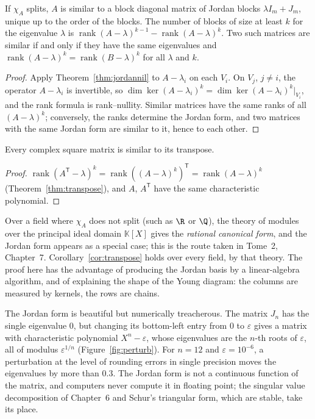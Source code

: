 \begin{corollary}\label{cor:jordan}
If $\chi_A$ splits, $A$ is similar to a block diagonal matrix of Jordan blocks $\lambda I_m+J_m$, unique up to the order of
the blocks. The number of blocks of size at least $k$ for the eigenvalue $\lambda$ is
$\operatorname{rank}(A-\lambda)^{k-1}-\operatorname{rank}(A-\lambda)^k$. Two such matrices are similar if and only if
they have the same eigenvalues and $\operatorname{rank}(A-\lambda)^k=\operatorname{rank}(B-\lambda)^k$ for all $\lambda$ and $k$.
\end{corollary}
\begin{proof}
Apply Theorem~\ref{thm:jordannil} to $A-\lambda_i$ on each $V_i$. On $V_j$, $j\ne i$, the operator $A-\lambda_i$ is invertible, so
$\dim\ker(A-\lambda_i)^k=\dim\ker(A-\lambda_i)^k|_{V_i}$, and the rank formula is rank--nullity. Similar matrices have the same
ranks of all $(A-\lambda)^k$; conversely, the ranks determine the Jordan form, and two matrices with the same Jordan form
are similar to it, hence to each other.
\end{proof}

\begin{corollary}\label{cor:transpose}
Every complex square matrix is similar to its transpose.
\end{corollary}
\begin{proof}
$\operatorname{rank}(A^{\mathsf T}-\lambda)^k=\operatorname{rank}((A-\lambda)^k)^{\mathsf T}=\operatorname{rank}(A-\lambda)^k$
(Theorem~\ref{thm:transpose}), and $A$, $A^{\mathsf T}$ have the same characteristic polynomial.
\end{proof}

\begin{remark}
Over a field where $\chi_A$ does not split (such as $\R$ or $\Q$), the theory of modules over the principal ideal
domain $\mathbb K[X]$ gives the \emph{rational canonical form}, and the Jordan form appears as a special case; this is
the route taken in Tome~2, Chapter~7. Corollary~\ref{cor:transpose} holds over every field, by that theory. The proof here
has the advantage of producing the Jordan basis by a linear-algebra algorithm, and of explaining the shape of the Young
diagram: the columns are measured by kernels, the rows are chains.
\end{remark}

The Jordan form is beautiful but numerically treacherous. The matrix $J_n$ has the single eigenvalue $0$, but changing its
bottom-left entry from $0$ to $\varepsilon$ gives a matrix with characteristic polynomial $X^n-\varepsilon$, whose eigenvalues
are the $n$-th roots of $\varepsilon$, all of modulus $\varepsilon^{1/n}$ (Figure~\ref{fig:perturb}). For $n=12$ and
$\varepsilon=10^{-6}$, a perturbation at the level of rounding errors in single precision moves the eigenvalues by more than $0.3$.
The Jordan form is not a continuous function of the matrix, and computers never compute it in floating point; the
singular value decomposition of Chapter~6 and Schur's triangular form, which are stable, take its place.


